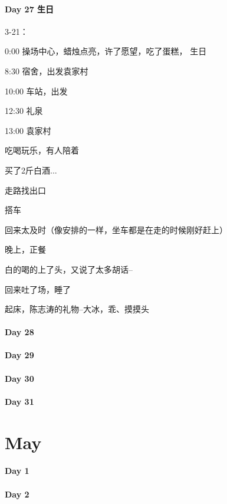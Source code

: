 \documentclass[UTF8,a4paper,8pt]{ctexbook}
\begin{document}
 	 \paragraph{Day 27      \quad   生日  }
	 	 3-21：
	 	 
	 	 0:00 操场中心，蜡烛点亮，许了愿望，吃了蛋糕， 生日
	 	 
	 	 8:30 宿舍，出发袁家村
	 	 
	 	 10:00 车站，出发
	 	 
	 	 12:30 礼泉
	 	 
	 	 13:00 袁家村
	 	 
	 	 吃喝玩乐，有人陪着~
	 	 
	 	 买了2斤白酒...
	 	 
	 	 走路找出口
	 	 
	 	 搭车
	 	 
	 	 回来太及时（像安排的一样，坐车都是在走的时候刚好赶上）
	 	 
	 	 晚上，正餐
	 	 
	 	 白的喝的上了头，又说了太多胡话--
	 	 
	 	 回来吐了场，睡了
	 	 
	 	 起床，陈志涛的礼物--大冰，乖、摸摸头
	 	 
	 	 
 	 \paragraph{Day 28      \quad     }
 	 \paragraph{Day 29      \quad     }   
 	 \paragraph{Day 30      \quad     }
 	 \paragraph{Day 31      \quad     }
 	  \newpage
 \section*{May}
 	 \paragraph{Day 1       \quad     }
 	 \paragraph{Day 2       \quad     }
\end{document}
